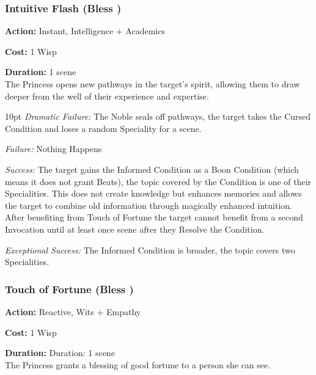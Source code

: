 \subsubsection*{Intuitive Flash (Bless \textbullet\textbullet)}

\noindent \textbf{Action:} Instant, Intelligence + Academics

\noindent \textbf{Cost:} 1 Wisp

\noindent \textbf{Duration:} 1 scene \\

\noindent The Princess opens new pathways in the target's spirit, allowing them to draw deeper from the well of their experience and expertise. 

\begin{myindentpar}{10pt} \emph{Dramatic Failure:} The Noble seals off pathways, the target takes the Cursed Condition and loses a random Speciality for a scene.

\emph{Failure:} Nothing Happens 

\emph{Success:} The target gains the Informed Condition as a Boon Condition (which means it does not grant Beats), the topic covered by the Condition is one of their Specialities. This does not create knowledge but enhances memories and allows the target to combine old information through magically enhanced intuition. After benefiting from Touch of Fortune the target cannot benefit from a second Invocation until at least once scene after they Resolve the Condition. 

\emph{Exceptional Success:} The Informed Condition is broader, the topic covers two Specialities.\end{myindentpar}

\subsubsection*{Touch of Fortune (Bless \textbullet\textbullet)}

\noindent \textbf{Action:} Reactive, Wits + Empathy

\noindent \textbf{Cost:} 1 Wisp

\noindent \textbf{Duration:} Duration: 1 scene \\

\noindent The Princess grants a blessing of good fortune to a person she can see.

